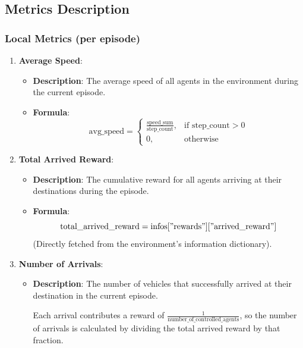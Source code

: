 \subsection{Metrics Description}

\subsubsection*{Local Metrics (per episode)}

\begin{enumerate}
    \item \textbf{Average Speed}:
    \begin{itemize}
        \item \textbf{Description}: The average speed of all agents in the environment during the current episode.
        \item \textbf{Formula}:
        \[
        \text{avg\_speed} =
        \begin{cases}
        \frac{\text{speed\_sum}}{\text{step\_count}}, & \text{if } \text{step\_count} > 0 \\
        0, & \text{otherwise}
        \end{cases}
        \]
    \end{itemize}
    
    \item \textbf{Total Arrived Reward}:
    \begin{itemize}
        \item \textbf{Description}: The cumulative reward for all agents arriving at their destinations during the episode.
        \item \textbf{Formula}:
        \[
        \text{total\_arrived\_reward} = \text{infos}["\text{rewards}"]["\text{arrived\_reward}"]
        \]
        (Directly fetched from the environment's information dictionary).
    \end{itemize}
    
    \item \textbf{Number of Arrivals}:
    \begin{itemize}
        \item \textbf{Description}: The number of vehicles that successfully arrived at their destination in the current episode. 
       
        Each arrival contributes a reward of \(\frac{1}{\text{number\_of\_controlled\_agents}}\), so the number of arrivals is calculated by dividing 
        the total arrived reward by that fraction.


\end{itemize}
\end{enumerate}
